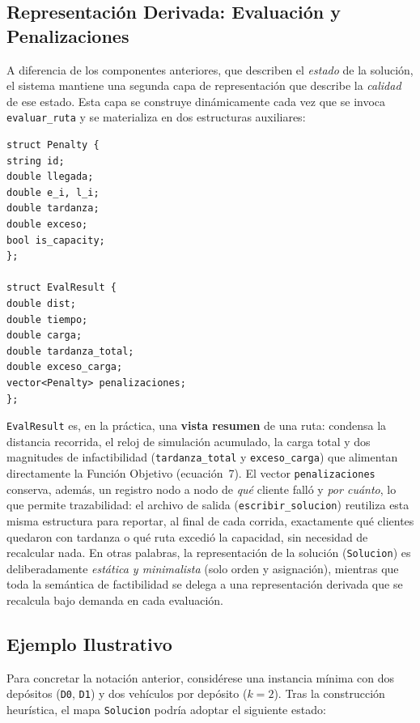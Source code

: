 \documentclass[letter, 10pt]{article}
\begin{document}
\subsection{Representaci\'on Derivada: Evaluaci\'on y Penalizaciones}

A diferencia de los componentes anteriores, que describen el \textit{estado} de la soluci\'on, el sistema mantiene una segunda capa de representaci\'on que describe la \textit{calidad} de ese estado. Esta capa se construye din\'amicamente cada vez que se invoca \texttt{evaluar\_ruta} y se materializa en dos estructuras auxiliares:

\begin{verbatim}
struct Penalty {
string id;
double llegada;
double e_i, l_i;
double tardanza;
double exceso;
bool is_capacity;
};

struct EvalResult {
double dist;
double tiempo;
double carga;
double tardanza_total;
double exceso_carga;
vector<Penalty> penalizaciones;
};
\end{verbatim}

\texttt{EvalResult} es, en la pr\'actica, una \textbf{vista resumen} de una ruta: condensa la distancia recorrida, el reloj de simulaci\'on acumulado, la carga total y dos magnitudes de infactibilidad (\texttt{tardanza\_total} y \texttt{exceso\_carga}) que alimentan directamente la Funci\'on Objetivo (ecuaci\'on~7). El vector \texttt{penalizaciones} conserva, adem\'as, un registro nodo a nodo de \textit{qu\'e} cliente fall\'o y \textit{por cu\'anto}, lo que permite trazabilidad: el archivo de salida (\texttt{escribir\_solucion}) reutiliza esta misma estructura para reportar, al final de cada corrida, exactamente qu\'e clientes quedaron con tardanza o qu\'e ruta excedi\'o la capacidad, sin necesidad de recalcular nada. En otras palabras, la representaci\'on de la soluci\'on (\texttt{Solucion}) es deliberadamente \textit{est\'atica y minimalista} (solo orden y asignaci\'on), mientras que toda la sem\'antica de factibilidad se delega a una representaci\'on derivada que se recalcula bajo demanda en cada evaluaci\'on.

\subsection{Ejemplo Ilustrativo}

Para concretar la notaci\'on anterior, consid\'erese una instancia m\'inima con dos dep\'ositos (\texttt{D0}, \texttt{D1}) y dos veh\'iculos por dep\'osito ($k=2$). Tras la construcci\'on heur\'istica, el mapa \texttt{Solucion} podr\'ia adoptar el siguiente estado:
\end{document}
